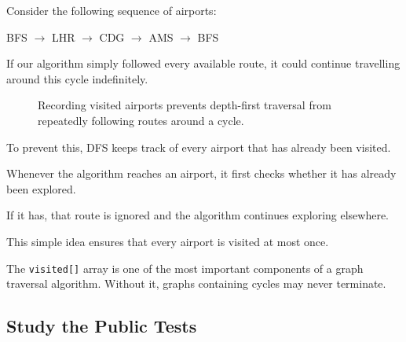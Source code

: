 \documentclass{csc2059practical}
\begin{document}
Consider the following sequence of airports:

\begin{center}
BFS $\rightarrow$ LHR $\rightarrow$ CDG $\rightarrow$ AMS $\rightarrow$ BFS
\end{center}

If our algorithm simply followed every available route, it could continue travelling around this cycle indefinitely.


\begin{figure}[htbp]
    \centering


    \caption{
        Recording visited airports prevents depth-first traversal
        from repeatedly following routes around a cycle.
    }
    \label{fig:dfs-visited-cycle}
\end{figure}


To prevent this, DFS keeps track of every airport that has already been visited.

Whenever the algorithm reaches an airport, it first checks whether it has already been explored.

If it has, that route is ignored and the algorithm continues exploring elsewhere.

This simple idea ensures that every airport is visited at most once.

\begin{importantnote}
The \texttt{visited[]} array is one of the most important components of a graph traversal algorithm. Without it, graphs containing cycles may never terminate.
\end{importantnote}

\subsection{Study the Public Tests}
\end{document}
